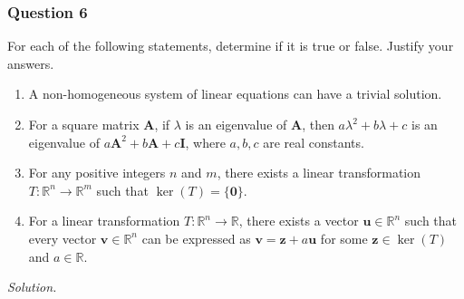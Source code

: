 \documentclass[12pt]{article}
\begin{document}
\subsubsection*{Question 6}
For each of the following statements, determine if it is true or false. Justify your answers.
\begin{enumerate}[label=\textbf{(\alph*)}]
\itemsep 0em
    \item A non-homogeneous system of linear equations can have a trivial solution.
    \item For a square matrix \(\mathbf{A}\), if \(\lambda\) is an eigenvalue of \(\mathbf{A}\), then \(a\lambda^2 + b\lambda + c\) is an eigenvalue of \(a\mathbf{A}^2 + b\mathbf{A} + c\mathbf{I}\), where \(a,b,c\) are real constants.
    \item For any positive integers \(n\) and \(m\), there exists a linear transformation \(T : \mathbb{R}^n \to \mathbb{R}^m\) such that \(\ker(T) = \{\mathbf{0}\}\).
    \item For a linear transformation \(T : \mathbb{R}^n \to \mathbb{R}\), there exists a vector \(\mathbf{u} \in \mathbb{R}^n\) such that every vector \(\mathbf{v} \in \mathbb{R}^n\) can be expressed as \(\mathbf{v} = \mathbf{z} + a\mathbf{u}\) for some \(\mathbf{z} \in \ker(T)\) and \(a \in \mathbb{R}\).
\end{enumerate}
\noindent\emph{Solution.}
\end{document}
